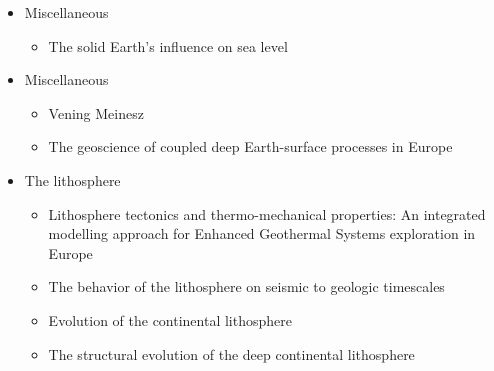 \begin{itemize}
\item Miscellaneous
   \begin{itemize}
   \item The solid Earth’s influence on sea level \cite{conr13}  
   \end{itemize}


\item Miscellaneous
   \begin{itemize}
   \item Vening Meinesz \cite{vlaa89}
   \item The geoscience of coupled deep Earth-surface processes in Europe \cite{clzb07}
   \end{itemize}

\item The lithosphere
   \begin{itemize}
   \item Lithosphere tectonics and thermo-mechanical properties: An integrated modelling
         approach for Enhanced Geothermal Systems exploration in Europe \cite{clvz10}
   \item The behavior of the lithosphere on seismic to geologic timescales \cite{wazh13}
   \item Evolution of the continental lithosphere \cite{slee05}
   \item The structural evolution of the deep continental lithosphere \cite{comm17}
   \end{itemize}


\end{itemize}
